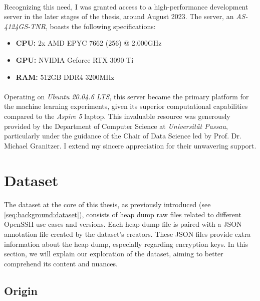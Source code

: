         \paragraph{}Recognizing this need, I was granted access to a high-performance development server in the later stages of the thesis, around August 2023. The server, an \textit{AS-4124GS-TNR}, boasts the following specifications:
        \begin{itemize}
            \item \textbf{CPU:} 2x AMD EPYC 7662 (256) @ 2.000GHz
            \item \textbf{GPU:} NVIDIA Geforce RTX 3090 Ti
            \item \textbf{RAM:} 512GB DDR4 3200MHz
        \end{itemize}
        \paragraph{}Operating on \textit{Ubuntu 20.04.6 LTS}, this server became the primary platform for the machine learning experiments, given its superior computational capabilities compared to the \textit{Aspire 5} laptop. This invaluable resource was generously provided by the Department of Computer Science at \textit{Universität Passau}, particularly under the guidance of the Chair of Data Science led by Prof. Dr. Michael Granitzer. I extend my sincere appreciation for their unwavering support.
        

    \section{Dataset}
        \paragraph{}The dataset at the core of this thesis, as previously introduced (see \ref{seq:background:dataset}), consists of heap dump raw files related to different OpenSSH use cases and versions. Each heap dump file is paired with a JSON annotation file created by the dataset's creators. These JSON files provide extra information about the heap dump, especially regarding encryption keys. In this section, we will explain our exploration of the dataset, aiming to better comprehend its content and nuances.

        \subsection{Origin}
